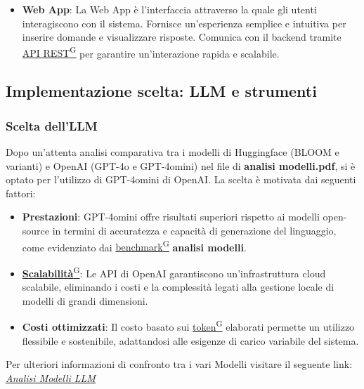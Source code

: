 \begin{itemize}
    \item \textbf{Web App}:  
    La Web App è l’interfaccia attraverso la quale gli utenti interagiscono con il sistema. Fornisce un’esperienza semplice e intuitiva per inserire domande e visualizzare risposte. Comunica con il backend tramite \href{https://code7crusaders.github.io/docs/RTB/documentazione_interna/glossario.html#api-rest-representational-state-transfer}{API REST\textsuperscript{G}} per garantire un'interazione rapida e scalabile.
\end{itemize}

\subsection{Implementazione scelta: LLM e strumenti}
\subsubsection{Scelta dell'LLM}
Dopo un'attenta analisi comparativa tra i modelli di Huggingface (BLOOM e varianti) e OpenAI (GPT-4o e GPT-4omini) nel file di \textbf{analisi modelli.pdf}, si è optato per l'utilizzo di GPT-4omini di OpenAI. La scelta è motivata dai seguenti fattori:
\begin{itemize}
    \item \textbf{Prestazioni}: GPT-4omini offre risultati superiori rispetto ai modelli open-source in termini di accuratezza e capacità di generazione del linguaggio, come evidenziato dai \href{https://code7crusaders.github.io/docs/RTB/documentazione_interna/glossario.html#benchmark}{benchmark\textsuperscript{G}} \textbf{analisi modelli}.
    \item \href{https://code7crusaders.github.io/docs/RTB/documentazione_interna/glossario.html#scalabilità}{\textbf{Scalabilità}\textsuperscript{G}}: Le API di OpenAI garantiscono un'infrastruttura cloud scalabile, eliminando i costi e la complessità legati alla gestione locale di modelli di grandi dimensioni.
    \item \textbf{Costi ottimizzati}: Il costo basato sui \href{https://code7crusaders.github.io/docs/RTB/documentazione_interna/glossario.html#token}{token\textsuperscript{G}} elaborati permette un utilizzo flessibile e sostenibile, adattandosi alle esigenze di carico variabile del sistema.
    \end{itemize}
    Per ulteriori informazioni di confronto tra i vari Modelli visitare il seguente link:
    \href{https://code7crusaders.github.io/docs/altri_documenti/analisi_modelli_firmato.html}{\textit{\underline{Analisi Modelli LLM}}}


